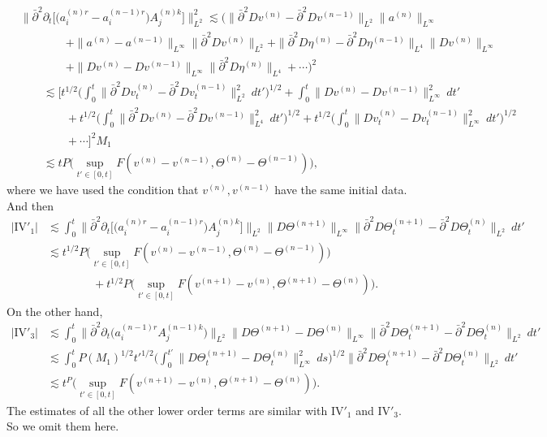 \documentclass[12pt,a4paper]{amsart}
\numberwithin{equation}{section}
\theoremstyle{plain}
\theoremstyle{definition}
\newcommand{\bpartial}{\bar{\partial}}
\begin{document}
\begin{align*}
&\Big\|\bpartial^2 \partial_t \Big[\Big( a^{(n)r}_i-a^{(n-1)r}_i \Big) A^{(n)k}_j\Big]\Big\|_{L^2}^2 \lesssim \Big(\|\bpartial^2 Dv^{(n)}-\bpartial^2 Dv^{(n-1)}\|_{L^2}\|a^{(n)}\|_{L^{\infty}}\\
&\qquad\qquad +\|a^{(n)}-a^{(n-1)}\|_{L^{\infty}}\|\bpartial^2 Dv^{(n)}\|_{L^2}+\|\bpartial^2 D\eta^{(n)}-\bpartial^2 D\eta^{(n-1)}\|_{L^4}\|Dv^{(n)}\|_{L^{\infty}}\\
&\qquad\qquad+\|Dv^{(n)}-Dv^{(n-1)}\|_{L^{\infty}}\|\bpartial^2 D\eta^{(n)}\|_{L^4}+\cdots\Big)^2\\
&\qquad \lesssim \Big[ t^{1/2}\Big(\int_{0}^{t}\|\bpartial^2 Dv_t^{(n)}-\bpartial^2 Dv_t^{(n-1)}\|_{L^2}^2 \ dt'\Big)^{1/2}+\int_{0}^{t}\| Dv^{(n)}-Dv^{(n-1)}\|_{L^{\infty}}^2 \ dt'\\
&\qquad\qquad  +t^{1/2}\Big(\int_{0}^{t}\|\bpartial^2 Dv^{(n)}-\bpartial^2 Dv^{(n-1)}\|_{L^4}^2 \ dt'\Big)^{1/2}+t^{1/2}\Big(\int_{0}^{t}\| Dv_t^{(n)}- Dv_t^{(n-1)}\|_{L^{\infty}}^2 \ dt'\Big)^{1/2}\\
&\qquad\qquad+\cdots\Big]^2 M_1\\
&\qquad \lesssim tP\Big(\sup\limits_{t'\in[0,t]}F(v^{(n)}-v^{(n-1)},\Theta^{(n)}-\Theta^{(n-1)})\Big),
\end{align*}
where we have used the condition that $v^{(n)},v^{(n-1)}$ have the same initial data.
And then
\begin{align*}
|\mathrm{IV}'_1|&\lesssim\int_{0}^{t}\Big\|\bpartial^2 \partial_t \Big[\Big( a^{(n)r}_i-a^{(n-1)r}_i \Big) A^{(n)k}_j\Big]\Big\|_{L^2}\|D\Theta^{(n+1)}\|_{L^{\infty}}\|\bpartial^2 D\Theta_t^{(n+1)}-\bpartial^2 D\Theta_t^{(n)}\|_{L^2} \ dt'\\
&\lesssim t^{1/2}P\Big(\sup\limits_{t'\in[0,t]}F(v^{(n)}-v^{(n-1)},\Theta^{(n)}-\Theta^{(n-1)})\Big)\\
& \qquad\qquad+t^{1/2} P\Big(\sup\limits_{t'\in[0,t]}F(v^{(n+1)}-v^{(n)},\Theta^{(n+1)}-\Theta^{(n)})\Big).
\end{align*}
On the other hand,
\begin{align*}
|\mathrm{IV}'_3|&\lesssim\int_{0}^{t}\Big\|\bpartial^2 \partial_t \Big(a^{(n-1)r}_i  A^{(n-1)k}_j\Big)\Big\|_{L^2}\|D\Theta^{(n+1)}-D\Theta^{(n)}\|_{L^{\infty}}\|\bpartial^2 D\Theta_t^{(n+1)}-\bpartial^2 D\Theta_t^{(n)}\|_{L^2} \ dt'\\
&\lesssim \int_{0}^{t} P(M_1)^{1/2} t'^{1/2}\Big(\int_{0}^{t'}\|D\Theta_t^{(n+1)}-D\Theta_t^{(n)}\|_{L^{\infty}}^2 \ ds\Big)^{1/2} \|\bpartial^2 D\Theta_t^{(n+1)}-\bpartial^2 D\Theta_t^{(n)}\|_{L^2} \ dt'\\
&\lesssim t^ P\Big(\sup\limits_{t'\in[0,t]}F(v^{(n+1)}-v^{(n)},\Theta^{(n+1)}-\Theta^{(n)})\Big).
\end{align*}
The estimates of all the other lower order terms are similar with $\mathrm{IV}'_1$ and $\mathrm{IV}'_3$. So we omit them here.
\end{document}
